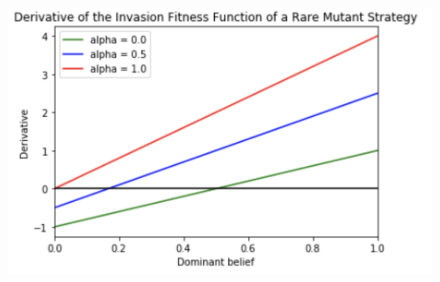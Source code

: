\documentclass[]{llncs}
\begin{document}
\begin{figure}
\centering
\includegraphics[width=12cm]{images/invasion_fitness_alpha}
\end{figure}
\end{document}
